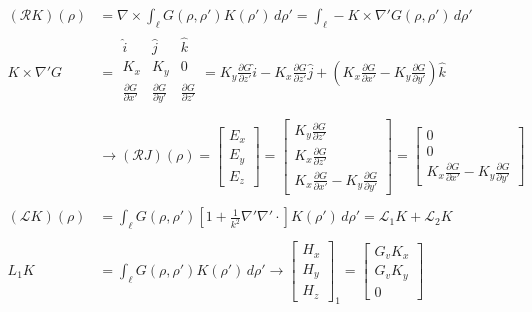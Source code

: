 \documentclass{article}
\newcommand{\K}{\mathbf{K}}
\newcommand{\0}{\varnothing}
\begin{document}
\begin{align*}
    (\mathcal{R}K)(\rho) &= \nabla \times \int_{\ell}G(\rho,\rho')K(\rho') \,d\rho'
         = \int_{\ell} - K \times \nabla' G(\rho,\rho') \,d\rho'\\
    K \times \nabla' G &= 
    \begin{array}{|ccc|}
    \hat i & \hat j & \hat k\\
    K_x & K_y & 0 \\
    \frac{\partial G}{\partial x'} & \frac{\partial G}{\partial y'} & \frac{\partial G}{\partial z'} \\
    \end{array}
       =  K_y \frac{\partial G}{\partial z'} \hat i - K_x\frac{\partial G}{\partial z'} \hat j + \left(K_x \frac{\partial G}{\partial x'} - K_y \frac{\partial G}{\partial y'}\right) \hat k\\
    & \rightarrow (\mathcal{R}J)(\rho) = \left[ \begin{array}{c} E_x \\ E_y \\ E_z \end{array} \right]  = 
      \left[ \begin{array}{c}  K_y \frac{\partial G}{\partial z'}\\ K_x \frac{\partial G}{\partial z'} \\K_x \frac{\partial G}{\partial x'} - K_y \frac{\partial G}{\partial y'}  \end{array} \right] = 
      \left[ \begin{array}{c} 0\\ 0 \\K_x \frac{\partial G}{\partial x'} - K_y \frac{\partial G}{\partial y'}   \end{array} \right]\\ \\
    (\mathcal{L}K)(\rho) &= \int_{\ell}G(\rho,\rho')[1+\frac{1}{k^2}\nabla'\nabla'\cdotp]K(\rho') \,d\rho' = \mathcal{L}_1 K + \mathcal{L}_2 K\\
    \\
    {L}_1 K &= \int_{\ell}G(\rho,\rho') K(\rho') \,d\rho' \rightarrow 
    \left[ \begin{array}{c} H_x \\ H_y \\ H_z \end{array} \right]_1 = \left[ \begin{array}{c} G_v K_x \\ G_v K_y \\ 0 \end{array} \right]\\

\end{align*}
\end{document}
